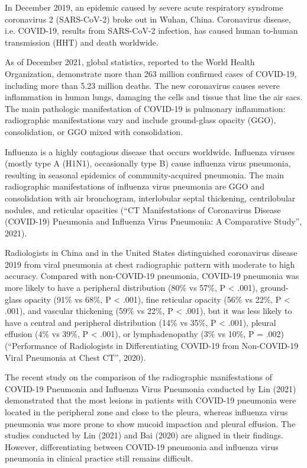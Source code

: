 \documentclass[12pt, twocolumn]{CUP-JNL-PPS}
\begin{document}
In December 2019, an epidemic caused by severe acute respiratory
syndrome coronavirus 2 (SARS-CoV-2) broke out in Wuhan, China. Coronavirus
disease, i.e. COVID-19, results from SARS-CoV-2 infection, has caused human to-human transmission (HHT) and death worldwide.

As of December 2021, global statistics, reported to the World Health
Organization, demonstrate more than 263 million confirmed cases of COVID-19,
including more than 5.23 million deaths. The new coronavirus causes severe
inflammation in human lungs, damaging the cells and tissue that line the air
sacs. The main pathologic manifestation of COVID-19 is pulmonary inflammation: radiographic manifestations vary and include ground-glass opacity (GGO), consolidation, or GGO mixed with consolidation.

Influenza is a highly contagious disease that occurs worldwide. Influenza viruses (mostly type A (H1N1), occasionally type B) cause influenza virus
pneumonia, resulting in seasonal epidemics of community-acquired pneumonia.
The main radiographic manifestations of influenza virus pneumonia are GGO and
consolidation with air bronchogram, interlobular septal thickening, centrilobular nodules, and reticular opacities (“CT Manifestations of Coronavirus Disease
(COVID-19) Pneumonia and Influenza Virus Pneumonia: A Comparative Study”, 2021).

Radiologists in China and in the United States distinguished coronavirus disease 2019 from viral pneumonia at chest radiographic pattern with
moderate to high accuracy. Compared with non-COVID-19 pneumonia, COVID-19 pneumonia was more likely to have a peripheral distribution (80\% vs 57\%, P < .001), ground-glass opacity (91\% vs 68\%, P < .001), fine reticular opacity (56\% vs 22\%, P < .001), and vascular thickening (59\% vs 22\%, P < .001), but it was less likely to have a central and peripheral distribution (14\% vs 35\%, P < .001), pleural effusion (4\% vs 39\%, P < .001), or lymphadenopathy (3\% vs 10\%, P = .002)
(“Performance of Radiologists in Differentiating COVID-19 from Non-COVID-19
Viral Pneumonia at Chest CT”, 2020).

The recent study on the comparison of the radiographic manifestations of COVID-19 Pneumonia and Influenza Virus Pneumonia conducted by Lin
(2021) demonstrated that the most lesions in patients with COVID-19 pneumonia
were located in the peripheral zone and close to the pleura, whereas influenza
virus pneumonia was more prone to show mucoid impaction and pleural effusion.
The studies conducted by Lin (2021) and Bai (2020) are aligned in their findings. However, differentiating between COVID-19 pneumonia and influenza virus
pneumonia in clinical practice still remains difficult.
\end{document}
